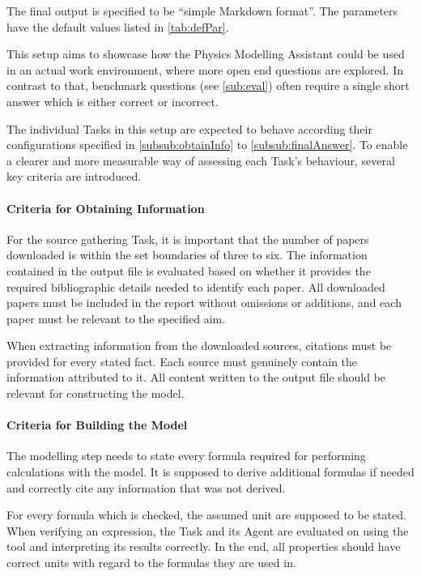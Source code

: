 \documentclass[
	fontsize = 11pt,
	paper = a4,
	draft = false,
	twoside = true,
	titlepage = false
]{scrartcl}
\numberwithin{equation}{subsection}
\begin{document}
	The final output is specified to be \enquote{simple Markdown format}.
	The parameters have the default values listed in \autoref{tab:defPar}.
	
	This setup aims to showcase how the Physics Modelling Assistant could be used in an actual work environment, where more open end questions are explored. In contrast to that, benchmark questions (see \autoref{sub:eval}) often require a single short answer which is either correct or incorrect.
	
	The individual Tasks in this setup are expected to behave according their configurations specified in \autoref{subsub:obtainInfo} to \autoref{subsub:finalAnswer}. To enable a clearer and more measurable way of assessing each Task's behaviour, several key criteria are introduced.
	
	\paragraph{Criteria for Obtaining Information} \label{criteria:info}
	For the source gathering Task, it is important that the number of papers downloaded is within the set boundaries of three to six. The information contained in the output file is evaluated based on whether it provides the required bibliographic details needed to identify each paper. All downloaded papers must be included in the report without omissions or additions, and each paper must be relevant to the specified aim.
	
	When extracting information from the downloaded sources, citations must be provided for every stated fact. Each source must genuinely contain the information attributed to it. All content written to the output file should be relevant for constructing the model.
	
	\paragraph{Criteria for Building the Model} \label{criteria:model}
	The modelling step needs to state every formula required for performing calculations with the model. It is supposed to derive additional formulas if needed and correctly cite any information that was not derived.
	
	For every formula which is checked, the assumed unit are supposed to be stated. When verifying an expression, the Task and its \gls{Agent} are evaluated on using the tool and interpreting its results correctly. In the end, all properties should have correct units with regard to the formulas they are used in.
	
\end{document}
